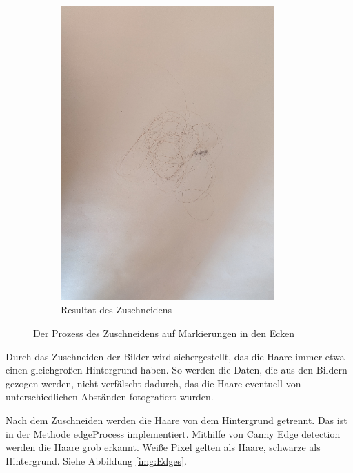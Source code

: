 \documentclass[german,a4paper,12pt]{llncs}
\begin{document}
\begin{figure}
\begin{subfigure}[b]{0.475\textwidth}
		\includegraphics[width=0.9\textwidth]{fig64/03crop image.png}
		\caption[]{Resultat des Zuschneidens}
		\label{img:Crop}
	\end{subfigure}
	\caption[ der Prozess des Zuschneidens auf Markierungen in den Ecken ]
	{\small Der Prozess des Zuschneidens auf Markierungen in den Ecken} 
	\label{img:cropDots}
\end{figure}


Durch das Zuschneiden der Bilder wird sichergestellt, das die Haare immer etwa einen gleichgroßen Hintergrund haben. So werden die Daten, die aus den Bildern gezogen werden, nicht verfälscht dadurch, das die Haare eventuell von unterschiedlichen Abständen fotografiert wurden. 

Nach dem Zuschneiden werden die Haare von dem Hintergrund getrennt.
Das ist in der Methode edgeProcess implementiert. 
Mithilfe von Canny Edge detection werden die Haare grob erkannt.
Weiße Pixel gelten als Haare, schwarze als Hintergrund. Siehe Abbildung \ref{img:Edges}.
\end{document}
